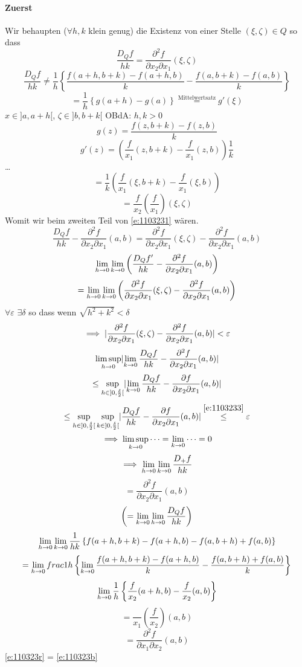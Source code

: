 \begin{Bew}
  \paragraph{Zuerst}
  Wir behaupten ($\forall h,k$ klein genug) die Existenz von einer Stelle $(\xi,\zeta)\in Q$ so dass
  \begin{equation}
    \label{e:1103231}
    \frac{D_Qf}{hk}=\frac{\partial^2f}{\partial x_2\partial x_1}(\xi, \zeta)
  \end{equation}
  \[\frac{D_Qf}{hk}\neq \frac{1}{h}\left\{ \frac{f(a+h,b+k)-f(a+h,b)}{k}-\frac{f(a,b+k)-f(a,b)}{k} \right\}\]
  \[=\frac{1}{h}\left\{ g(a+h)-g(a) \right\}\stackrel{\text{Mittelwertsatz}}{=}g'(\xi)\]
  $x\in ]a,a+h[$, $\zeta\in]b,b+k[$ OBdA: $h,k>0$
  \[g(z)=\frac{f(z,b+k)-f(z,b)}{k}\]
  \[g'(z)=\left( \dfrac{f}{x_1}(z,b+k)-\dfrac{f}{x_1}(z,b) \right)\frac{1}{k}\]
  \ldots
  \[=\frac{1}{k}\left( \dfrac{f}{x_1}(\xi,b+k)-\dfrac{f}{x_1}(\xi,b) \right)\]
  \[=\dfrac{f}{x_2}\left( \dfrac{f}{x_1} \right)(\xi,\zeta)\]
  Womit wir beim zweiten Teil von \ref{e:1103231} wären.
  \[\frac{D_Qf}{hk}-\frac{\partial^2f}{\partial x_2\partial x_1}(a,b)=\frac{\partial^2f}{\partial x_2\partial x_1}(\xi,\zeta)-\frac{\partial^2f}{\partial x_2\partial x_1}(a,b)\]
  \[\displaystyle\lim_{h\rightarrow0}\displaystyle\lim_{k\rightarrow0}\left( \frac{D_Qf'}{hk}-\frac{\partial^2f}{\partial x_2\partial x_1}(a,b) \right)\]
  \[=\displaystyle\lim_{h\rightarrow0}\displaystyle\lim_{k\rightarrow0}\left( \frac{\partial^2f}{\partial x_2\partial x_1}(\xi,\zeta)-\frac{\partial^2 f}{\partial x_2\partial x_1}(a,b) \right)\]
  $\forall \varepsilon$ $\exists \delta$ so dass wenn $\sqrt{h^2+k^2}<\delta$
  \begin{equation}
    \label{e:1103233}
    \implies \mathopen| \frac{\partial^2f}{\partial x_2\partial x_1}(\xi,\zeta)-\frac{\partial^2f}{\partial x_2\partial x_1}(a,b) \mathclose|<\varepsilon
  \end{equation}
  \[\limsup_{h\rightarrow 0}\mathopen| \displaystyle\lim_{k\rightarrow0}\frac{D_Qf}{hk}-\frac{\partial^2 f}{\partial x_2\partial x_1}(a,b) \mathclose|\]
  \[\leq \sup_{h\in ]0,\frac{\delta}{2}[}\mathopen| \displaystyle\lim_{k\rightarrow0}\frac{D_Qf}{hk}-\frac{\partial f}{\partial x_2 \partial x_1}(a,b) \mathclose|\]
  \[\leq \sup_{h\in ]0,\frac{\delta}{2}[}\sup_{k\in ]0,\frac{\delta}{2}[}\mathopen| \frac{D_Qf}{hk}-\frac{\partial f}{\partial x_2 \partial x_1}(a,b) \mathclose|\stackrel{\ref{e:1103233}}{\leq} \varepsilon\]
  \[\implies \limsup_{k\rightarrow 0}\cdots=\displaystyle\lim_{k\rightarrow0}\cdots=0\]
  \[\implies\displaystyle\lim_{h\rightarrow0}\displaystyle\lim_{k\rightarrow0}\frac{D_+f}{hk}\]
  \begin{equation}
    \label{e:110323r}
    =\frac{\partial^2f}{\partial x_2\partial x_1}(a,b)
  \end{equation}
  \[\left( =\displaystyle\lim_{k\rightarrow0}\displaystyle\lim_{h\rightarrow0}\frac{D_Qf}{hk} \right)\]
  \[\displaystyle\lim_{h\rightarrow0}\displaystyle\lim_{k\rightarrow0}\frac{1}{hk}\left\{ f(a+h,b+k)-f(a+h,b)-f(a,b+h)+f(a,b) \right\}\]
  \[=\displaystyle\lim_{h\rightarrow0}\\frac{1}{h}\left\{ \displaystyle\lim_{k\rightarrow0} \frac{f(a+h,b+k)-f(a+h,b)}{k}-\frac{f(a,b+h)+f(a,b)}{k} \right\}\]
  \[\displaystyle\lim_{h\rightarrow0}\frac{1}{h}\left\{ \dfrac{f}{x_2}(a+h,b)-\dfrac{f}{x_2}(a,b) \right\}\]
  \[=\dfrac{}{x_1}\left( \dfrac{f}{x_2} \right)(a,b)\]
  \begin{equation}
    \label{e:110323b}
    =\frac{\partial^2f}{\partial x_1\partial x_2}(a,b)
  \end{equation}
  \ref{e:110323r} = \ref{e:110323b}
\end{Bew}
